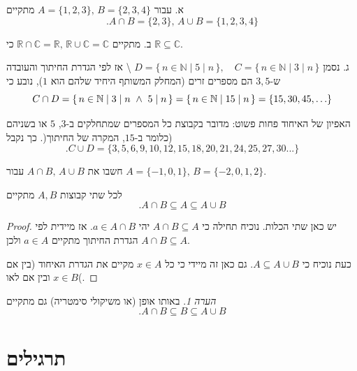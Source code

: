 \documentclass[
  hebrew,
  12pt,
  a4paper,
  oneside]{book}
\theoremstyle{definition}
\theoremstyle{remark}
\theoremstyle{plain}
\theoremstyle{remark}
\newtheorem*{remark}{הערה}
\begin{document}
\begin{example}

א. עבור \(A=\{1,2,3\},\,B=\{2,3,4\}\) מתקיים
\[.A\cap B=\{2,3\},\,A\cup B=\{1,2,3,4\}\]

ב. מתקיים
\(\mathbb{R}\cap\mathbb{C}=\mathbb{R},\,\mathbb{R}\cup\mathbb{C}=\mathbb{C}\)
כי \(\mathbb{R\subseteq\mathbb{C}}\).

ג. נסמן
\(D = \{\, n \in \mathbb{N} \mid 5 \mid n \,\}, \quad C = \{\, n \in \mathbb{N} \mid 3 \mid n \,\}\)
\textbackslash{} אז לפי הגדרת החיתוך והעובדה ש-\(3,5\) הם מספרים זרים
(המחלק המשותף היחיד שלהם הוא \(1\)), נובע כי
\[ C \cap D = \{\, n \in \mathbb{N} \mid 3 \mid n \ \land\ 5 \mid n \,\} = \{\, n \in \mathbb{N} \mid 15 \mid n \,\} \\ = \{15,30,45,\ldots\} \]

האפיון של האיחוד פחות פשוט: מדובר בקבוצת כל המספרים שמתחלקים ב-\(3\),
\(5\) או בשניהם (כלומר ב-\(15\), המקרה של החיתוך(. כך נקבל
\[.C\cup D=\{3,5,6,9,10,12,15,18,20,21,24,25,27,30...\}\]

\end{example}

חשבו את \(A\cap B,\,A\cup B\) עבור \(A=\{-1,0,1\},\,B=\{-2,0,1,2\}\).

\begin{proposition}

לכל שתי קבוצות \(A,B\) מתקיים \[.A\cap B\subseteq A\subseteq A\cup B\]

\end{proposition}

\begin{proof}
יש כאן שתי הכלות. נוכיח תחילה כי \(A\cap B\subseteq A\) יהי
\(a\in A\cap B\). אז מיידית לפי הגדרת החיתוך מתקיים \(a\in A\) ולכן
\(A\cap B\subseteq A\).

כעת נוכיח כי \(A\subseteq A\cup B\). גם כאן זה מיידי כי כל \(x\in A\)
מקיים את הגדרת האיחוד (בין אם \(x\in B\) ובין אם לאו(.
\end{proof}

\begin{remark}
באותו אופן (או משיקולי סימטריה) גם מתקיים
\[.A\cap B\subseteq B\subseteq A\cup B\]
\end{remark}

\section*{תרגילים}\label{ux5eaux5e8ux5d2ux5d9ux5dcux5d9ux5dd}

\end{document}

